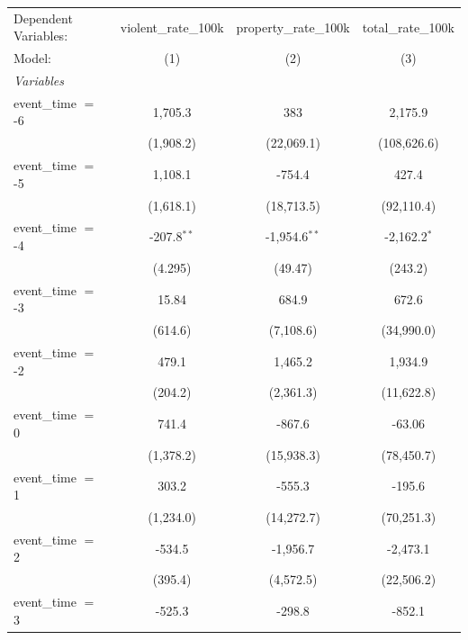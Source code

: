 
\begingroup
\centering
\begin{tabular}{lccc}
   \tabularnewline \midrule \midrule
   Dependent Variables: & violent\_rate\_100k   & property\_rate\_100k   & total\_rate\_100k\\    
   Model:               & (1)                   & (2)                    & (3)\\  
   \midrule
   \emph{Variables}\\
   event\_time $=$ -6   & 1,705.3               & 383                    & 2,175.9\\   
                        & (1,908.2)             & (22,069.1)             & (108,626.6)\\   
   event\_time $=$ -5   & 1,108.1               & -754.4                 & 427.4\\   
                        & (1,618.1)             & (18,713.5)             & (92,110.4)\\   
   event\_time $=$ -4   & -207.8$^{**}$         & -1,954.6$^{**}$        & -2,162.2$^{*}$\\   
                        & (4.295)               & (49.47)                & (243.2)\\   
   event\_time $=$ -3   & 15.84                 & 684.9                  & 672.6\\   
                        & (614.6)               & (7,108.6)              & (34,990.0)\\   
   event\_time $=$ -2   & 479.1                 & 1,465.2                & 1,934.9\\   
                        & (204.2)               & (2,361.3)              & (11,622.8)\\   
   event\_time $=$ 0    & 741.4                 & -867.6                 & -63.06\\   
                        & (1,378.2)             & (15,938.3)             & (78,450.7)\\   
   event\_time $=$ 1    & 303.2                 & -555.3                 & -195.6\\   
                        & (1,234.0)             & (14,272.7)             & (70,251.3)\\   
   event\_time $=$ 2    & -534.5                & -1,956.7               & -2,473.1\\   
                        & (395.4)               & (4,572.5)              & (22,506.2)\\   
   event\_time $=$ 3    & -525.3                & -298.8                 & -852.1\\   

\end{tabular}
